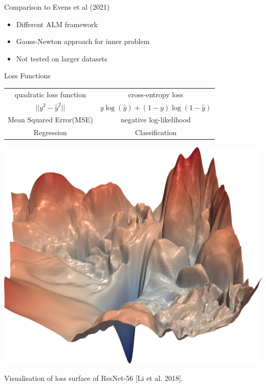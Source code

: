 \documentclass[11pt,t]{beamer}
\begin{document}
\appendix
\begin{frame}[noframenumbering,label=extraframe]{Comparison to Evens et al (2021)}
\begin{itemize}
	\item Different ALM framework
	\item Gauss-Newton approach for inner problem
	\item Not tested on larger datasets
\end{itemize}
\end{frame}
\begin{frame}[noframenumbering,label=extraframe]{Loss Functions}
\renewcommand{\arraystretch}{2}
\centering
\begin{tabular}{ c c}
	quadratic loss function & cross-entropy loss \\
	$||y^2-\hat y^2||$ & $y\log(\hat y)+(1-y)\log(1-\hat y)$ \\
	Mean Squared Error(MSE) & negative log-likelihood \\
	Regression & Classification\\
\end{tabular}
\end{frame}

\begin{frame}[noframenumbering,label=extraframe] 
\centering
\includegraphics[width=.8\textwidth]{surface1}

Visualisation of loss surface of ResNet-56 [Li et al. 2018].
\end{frame}
\end{document}
